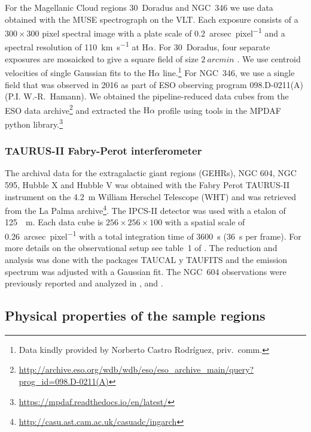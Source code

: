\documentclass[fleqn,usenatbib, useAMS, a4paper]{mnras}
\newcommand\ha{\ensuremath{\text{H}\alpha}}
\begin{document}
For the Magellanic Cloud regions 30~Doradus and NGC~346 we use data obtained
with the MUSE spectrograph \citep{Bacon:2010a, Bacon:2014a} on the VLT.\@
Each exposure consists of a \(300 \times 300\) pixel spectral image with a plate scale
of \SI{0.2}{arcsec.pixel^{-1}} and a spectral resolution of \SI{110}{km.s^{-1}}
at \ha{}.
For 30~Doradus, four separate exposures are mosaicked to give a square field of
size \(\SI{2}{arcmin}\) \citep{Castro:2018a}. 
We use centroid velocities of single Gaussian fits to the \ha{} line.\footnote{%
  Data kindly provided by Norberto Castro Rodríguez, priv.~comm.
}
For NGC~346, we use a single field that was observed in 2016 as part of
ESO observing program 098.D-0211(A) (P.I. W.-R.~Hamann).
We obtained the pipeline-reduced data cubes from the ESO data archive\footnote{%
  \url{http://archive.eso.org/wdb/wdb/eso/eso_archive_main/query?prog_id=098.D-0211(A)}
}
and extracted the \ha{} profile using tools in the MPDAF python library.\footnote{
  \url{https://mpdaf.readthedocs.io/en/latest/}
} 

\subsubsection{TAURUS-II Fabry-Perot interferometer}
\label{sec:taurus-ii-fabry}

The archival data for the extragalactic giant regions (GEHRs), NGC 604, NGC 595, Hubble X and Hubble V was obtained with the Fabry Perot TAURUS-II instrument
\citep{Gordon:2000v}
on the \SI{4.2}{m} William Herschel Telescope (WHT) and was retrieved from the La Palma archive\footnote{\url{http://casu.ast.cam.ac.uk/casuadc/ingarch}}.
The IPCS-II detector was used with a etalon of \SI{125}{\mu m}.
Each data cube is \(256 \times 256 \times 100\) with a spatial scale of \SI{0.26}{arcsec.pixel^{-1}} with a total integration time of \SI{3600}{s} (\SI{36}{s} per frame).
For more details on the observational setup see table~1 of \citet{sabalisck1995supersonic}.
The reduction and analysis was done with the packages TAUCAL y TAUFITS \citep{1992ASPC...25..445L} and the emission spectrum was adjusted with a Gaussian fit.
The NGC~604 observations were previously reported and analyzed in
\citet{sabalisck1995supersonic}, \citet{Medina-Tanco:1997a} and \citet{Melnick:2021x}.


\subsection{Physical properties of the sample regions}
\label{sec:regions-milky-way}
\end{document}
